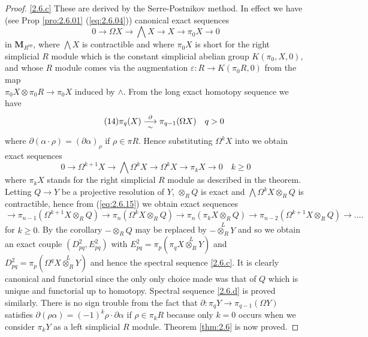 \documentclass[../main]{subfiles}
\begin{document}
\begin{proof}
\ref{2.6.c} These are derived by the Serre-Postnikov method. In effect we have (see Prop \ref{pro:2.6.01} (\ref{eq:2.6.04})) canonical exact sequences 
\begin{equation}\label{eq:2.6.13}\tag{13}
0 \longrightarrow  \Omega X \longrightarrow  \bigwedge X \longrightarrow  X \longrightarrow  \pi_0 X \longrightarrow  0
\end{equation}
in $\mathbf M_{R^{op}}$, where $\bigwedge X$ is contractible and where $\pi_0 X$ is short for the right simplicial $R$ module which is the constant simplicial abelian group $K(\pi_0, X, 0)$, and whose $R$ module comes via the augmentation $\varepsilon \colon R \longrightarrow  K (\pi_0 R, 0)$ from the map \\$\pi_0 X \otimes \pi_0 R \longrightarrow  \pi_0 X$ induced by $\wedge $. From the long exact homotopy sequence we have 
\begin{equation}\label{eq:2.6.14}\tag{14}
    \pi_q (X) \varrightarrow[\sim]{\partial} \pi_{q-1} (\Omega X) \quad q > 0
\end{equation}
where $\partial (\alpha \cdot \rho ) = (\partial \alpha)_{\rho }$ if $\rho  \in \pi R$. Hence substituting $\Omega^{k} X$ into we obtain exact sequences 
\begin{equation}\label{eq:2.6.15}\tag{15}
0 \longrightarrow  \Omega^{k+1} X \longrightarrow  \bigwedge \Omega^{k} X \longrightarrow  \Omega^{k} X \longrightarrow  \pi_k X \longrightarrow  0 \quad k \geq 0
\end{equation}
where $\pi_k X$ stands for the right simplicial $R$ module as described in the theorem. Letting $Q \longrightarrow  Y$ be a projective resolution of $Y$, $\otimes_R Q$ is exact and $\bigwedge \Omega^{k} X \otimes_R Q$ is contractible, hence from (\ref{eq:2.6.15}) we obtain exact sequences 
\[ 
    \longrightarrow  \pi_{n-1} (\Omega^{k+1} X \otimes_R Q) \longrightarrow  \pi_n (\Omega^{k} X \otimes_R Q) \longrightarrow  \pi_n (\pi_k X \otimes_R Q) \longrightarrow  \pi_{n-2} (\Omega^{k+1} X \otimes_R Q) \longrightarrow  \ldots
.\]
for $k \geq 0$. By the corollary $-\otimes_R Q$ may be replaced by $-\overset{L}{\otimes_R} Y$ and so we obtain an exact couple $(D_{pq}^2, E_{pq}^2)$ with $E_{pq}^2 = \pi_p (\pi_q X \overset{L}{\otimes_R} Y)$ and $D_{pq}^2 = \pi_p (\Omega^{q} X \overset{L}{\otimes_R} Y)$ and hence the spectral sequence \ref{2.6.c}. It is clearly canonical and functorial since the only only choice made was that of $Q$ which is unique and functorial up to homotopy. Spectral sequence \ref{2.6.d} is proved similarly. There is no sign trouble from the fact that $\partial \colon \pi_q Y \longrightarrow  \pi_{q-1} (\Omega Y)$ satisfies $\partial (\rho \alpha) = (-1)^{k} \rho \cdot \partial \alpha$ if $\rho \in \pi_k R$ because only $k = 0$ occurs when we consider $\pi_k Y$ as a left simplicial $R$ module. Theorem \ref{thm:2.6} is now proved.\end{proof}
\end{document}
